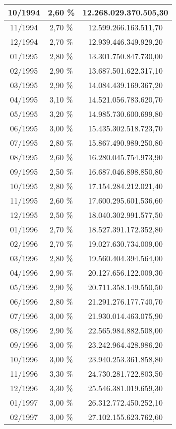 \begin{center}
\begin{longtable}{|c|c|c|}
10/1994 & 2,60 \% & 12.268.029.370.505,30 \\ \hline
11/1994 & 2,70 \% & 12.599.266.163.511,70 \\ \hline
12/1994 & 2,70 \% & 12.939.446.349.929,20 \\ \hline
01/1995 & 2,80 \% & 13.301.750.847.730,00 \\ \hline
02/1995 & 2,90 \% & 13.687.501.622.317,10 \\ \hline
03/1995 & 2,90 \% & 14.084.439.169.367,20 \\ \hline
04/1995 & 3,10 \% & 14.521.056.783.620,70 \\ \hline
05/1995 & 3,20 \% & 14.985.730.600.699,80 \\ \hline
06/1995 & 3,00 \% & 15.435.302.518.723,70 \\ \hline
07/1995 & 2,80 \% & 15.867.490.989.250,80 \\ \hline
08/1995 & 2,60 \% & 16.280.045.754.973,90 \\ \hline
09/1995 & 2,50 \% & 16.687.046.898.850,80 \\ \hline
10/1995 & 2,80 \% & 17.154.284.212.021,40 \\ \hline
11/1995 & 2,60 \% & 17.600.295.601.536,60 \\ \hline
12/1995 & 2,50 \% & 18.040.302.991.577,50 \\ \hline
01/1996 & 2,70 \% & 18.527.391.172.352,80 \\ \hline
02/1996 & 2,70 \% & 19.027.630.734.009,00 \\ \hline
03/1996 & 2,80 \% & 19.560.404.394.564,00 \\ \hline
04/1996 & 2,90 \% & 20.127.656.122.009,30 \\ \hline
05/1996 & 2,90 \% & 20.711.358.149.550,50 \\ \hline
06/1996 & 2,80 \% & 21.291.276.177.740,70 \\ \hline
07/1996 & 3,00 \% & 21.930.014.463.075,90 \\ \hline
08/1996 & 2,90 \% & 22.565.984.882.508,00 \\ \hline
09/1996 & 3,00 \% & 23.242.964.428.986,20 \\ \hline
10/1996 & 3,00 \% & 23.940.253.361.858,80 \\ \hline
11/1996 & 3,30 \% & 24.730.281.722.803,50 \\ \hline
12/1996 & 3,30 \% & 25.546.381.019.659,30 \\ \hline
01/1997 & 3,00 \% & 26.312.772.450.252,10 \\ \hline
02/1997 & 3,00 \% & 27.102.155.623.762,60 \\ \hline

\end{longtable}
\end{center}

